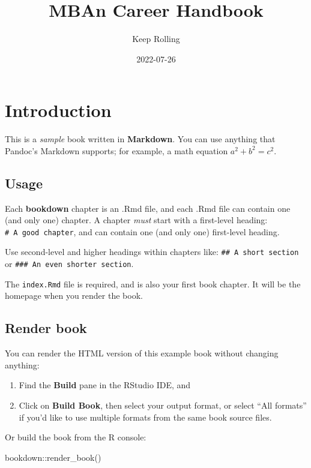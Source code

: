 \documentclass[
]{book}
\title{MBAn Career Handbook}
\author{Keep Rolling}
\date{2022-07-26}
\newenvironment{Shaded}{\begin{snugshade}}{\end{snugshade}}
\newcommand{\FunctionTok}[1]{\textcolor[rgb]{0.00,0.00,0.00}{#1}}
\newcommand{\NormalTok}[1]{#1}
\newcommand{\SpecialCharTok}[1]{\textcolor[rgb]{0.00,0.00,0.00}{#1}}
\begin{document}
\maketitle

{
\setcounter{tocdepth}{1}
\tableofcontents
}
\hypertarget{introduction}{%
\chapter{Introduction}\label{introduction}}

This is a \emph{sample} book written in \textbf{Markdown}. You can use anything that Pandoc's Markdown supports; for example, a math equation \(a^2 + b^2 = c^2\).

\hypertarget{usage}{%
\section{Usage}\label{usage}}

Each \textbf{bookdown} chapter is an .Rmd file, and each .Rmd file can contain one (and only one) chapter. A chapter \emph{must} start with a first-level heading: \texttt{\#\ A\ good\ chapter}, and can contain one (and only one) first-level heading.

Use second-level and higher headings within chapters like: \texttt{\#\#\ A\ short\ section} or \texttt{\#\#\#\ An\ even\ shorter\ section}.

The \texttt{index.Rmd} file is required, and is also your first book chapter. It will be the homepage when you render the book.

\hypertarget{render-book}{%
\section{Render book}\label{render-book}}

You can render the HTML version of this example book without changing anything:

\begin{enumerate}
\def\labelenumi{\arabic{enumi}.}
\item
  Find the \textbf{Build} pane in the RStudio IDE, and
\item
  Click on \textbf{Build Book}, then select your output format, or select ``All formats'' if you'd like to use multiple formats from the same book source files.
\end{enumerate}

Or build the book from the R console:

\begin{Shaded}
\begin{Highlighting}[]
\NormalTok{bookdown}\SpecialCharTok{::}\FunctionTok{render\_book}\NormalTok{()}
\end{Highlighting}
\end{Shaded}
\end{document}
